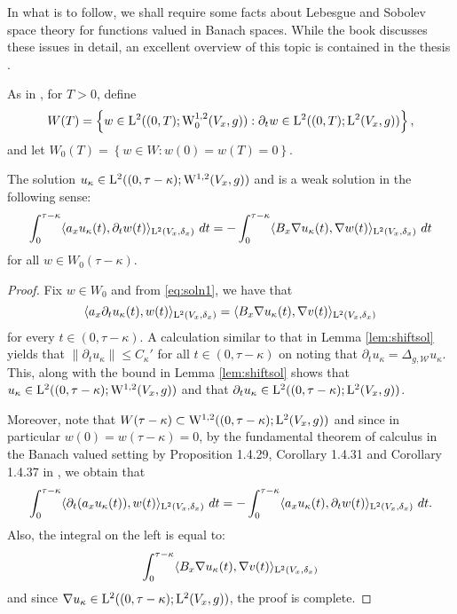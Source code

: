 \documentclass[AMS,STIX1COL]{WileyNJD-v2}
\numberwithin{equation}{section}
\renewcommand{\~}{\tilde}
\renewcommand{\-}{\bar}
\newcommand{\8}{\infty}
\newcommand{\cW}{\mathcal{W}}
\newcommand{\dbrac}[1]{\left\{#1\right\}}
\newcommand{\set}[1]{\dbrac{#1}}
\newcommand{\norm}[1]{\| #1 \|}			%
\newcommand{\inprod}[1]{\langle #1 \rangle}	%
\newcommand{\Lp}[2][{}]{{\rm L}^{#2}_{\rm #1}}		%
\newcommand{\Sob}[2][{}]{{\rm W}^{#2}_{\rm #1}}		%
\newcommand{\SobH}[2][{}]{{\Sob[#1]{#2,2}}}	%
\begin{document}
In what is to follow, we shall require some facts about 
Lebesgue and Sobolev space theory for functions valued 
in Banach spaces. While the book \cite{CH} discusses these issues
in detail, an excellent overview of this topic
is contained in the thesis \cite{Kreuter}.

As in \cite{CS}, for $T > 0$, define 
$$ W(T) = \set{ w \in \Lp{2}( (0,T); \SobH[0]{1}(V_x,g)): \partial_t w \in \Lp{2}((0,T); \Lp{2}(V_x, g))},$$
and let $W_0(T) = \set{ w \in W: w(0) = w(T) = 0}.$

\begin{lemma}
\label{Lem:testfn2} 
The solution $u_\kappa \in \Lp{2}((0, \tau - \kappa); \SobH{1}(V_x, g))$
and is a weak solution in the following sense:
\begin{equation}
\label{eq:testfn2} 
\int_{0}^{\tau - \kappa} \inprod{a_x u_\kappa(t), \partial_t w(t)}_{\Lp{2}(V_x,\delta_x)}\ dt 
		= -\int_{0}^{\tau - \kappa } \inprod{B_x \nabla u_\kappa(t), \nabla w(t)}_{\Lp{2}(V_x, \delta_x)}\ dt
\end{equation}
for all $w \in W_0(\tau - \kappa)$.
\end{lemma}
\begin{proof}
Fix $w \in W_0$ and from \eqref{eq:soln1}, we have that
$$\inprod{a_x \partial_t u_\kappa (t), w(t)}_{\Lp{2}(V_x, \delta_x)} 
		= \inprod{ B_x \nabla u_\kappa(t), \nabla v(t)}_{\Lp{2}(V_x, \delta_x)}$$
for every $t \in (0, \tau - \kappa)$.
A calculation similar to that in Lemma \ref{lem:shiftsol} 
yields that $\norm{ \partial_t u_\kappa} \leq C_\kappa'$
for all $t \in (0, \tau - \kappa)$
on noting that $\partial_t u_\kappa = \Delta_{g,\cW} u_\kappa$.
This, along with the bound in Lemma \ref{lem:shiftsol}
shows that  $u_\kappa \in \Lp{2}((0, \tau - \kappa); \SobH{1}(V_x, g))$
and that $\partial_t u_\kappa \in \Lp{2}((0,\tau - \kappa); \Lp{2}(V_x, g))$. 

Moreover, note that $W(\tau- \kappa) \subset \SobH{1}((0,\tau-\kappa); \Lp{2}(V_x,g))$
and since in particular $w(0) = w(\tau - \kappa) = 0$, by the fundamental theorem of calculus in the Banach 
valued setting by Proposition 1.4.29, Corollary 1.4.31 and Corollary 1.4.37 in  \cite{CH}, we obtain that
$$\int_{0}^{\tau - \kappa} \inprod{ \partial_t(a_x u_\kappa(t)), w(t)}_{\Lp{2}(V_x,\delta_x)}\ dt
	= - \int_0^{\tau - \kappa} \inprod{a_x u_\kappa(t), \partial_t w(t)}_{\Lp{2}(V_x, \delta_x)}\ dt.$$
Also, the integral on the left is equal to:
$$ \int_0^{\tau - \kappa}  \inprod{ B_x \nabla u_\kappa(t), \nabla v(t)}_{\Lp{2}(V_x, \delta_x)}$$
and since  $\nabla u_\kappa \in \Lp{2}((0, \tau - \kappa); \Lp{2}(V_x,g))$,
the proof is complete.
\end{proof} 
\end{document}
